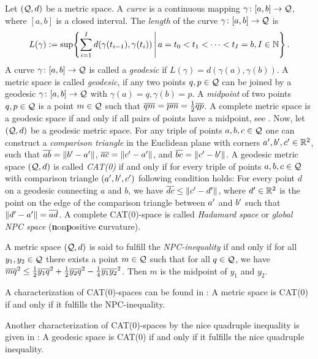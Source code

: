 Let $(\mathcal{Q}, d)$ be a metric space. A \textit{curve} is a continuous mapping $\gamma \colon [a,b] \to \mathcal{Q}$, where $[a,b]$ is a closed interval. The \textit{length} of the curve $\gamma \colon [a,b] \to \mathcal{Q}$ is
%
\begin{equation*}
	L(\gamma) := \sup\mathopen{}\left\lbrace \sum_{i=1}^I d(\gamma(t_{i-1}), \gamma(t_i)) \,\Bigg\vert\, a = t_0 < t_1 < \dots < t_I = b, I\in\mathbb{N} \right\rbrace\mathclose{}
	\, .
\end{equation*}
%
A curve $\gamma \colon [a,b] \to \mathcal{Q}$ is called a \textit{geodesic} if $L(\gamma) = d(\gamma(a),\gamma(b))$.
A metric space is called \textit{geodesic}, if any two points $q,p\in\mathcal{Q}$ can be joined by a geodesic $\gamma \colon [a,b] \to \mathcal{Q}$ with $\gamma(a) = q, \gamma(b) = p$.
A \textit{midpoint} of two points $q,p\in\mathcal{Q}$ is a point $m\in \mathcal{Q}$ such that $\overline{qm} = \overline{pm} = \frac12 \overline{qp}$.
A complete metric space is a geodesic space if and only if all pairs of points have a midpoint, see \cite[Proposition 1.2]{sturm03}.
Now, let $(\mathcal{Q}, d)$ be a geodesic metric space.
For any triple of points $a,b,c\in\mathcal{Q}$ one can construct a \textit{comparison triangle} in the Euclidean plane with corners $a^\prime, b^\prime, c^\prime \in \mathbb{R}^2$, such that $\overline{ab} = \Vert b^\prime - a^\prime \Vert$, $\overline{ac} = \Vert c^\prime - a^\prime \Vert$, and $\overline{bc} = \Vert c^\prime - b^\prime \Vert$. A geodesic metric space  $(\mathcal{Q}, d)$ is called \textit{CAT(0)} if and only if for every triple of points $a,b,c\in\mathcal{Q}$ with comparison triangle $(a^\prime, b^\prime, c^\prime)$ following condition holds: For every point $d$ on a geodesic connecting $a$ and $b$, we have $\overline{dc} \leq \Vert c^\prime - d^\prime \Vert$, where $d^\prime \in \mathbb{R}^2$ is the point on the edge of the comparison triangle between $a^\prime$ and $b^\prime$ such that $\Vert d^\prime- a^\prime \Vert = \overline{ad}$.
A complete CAT(0)-space is called \textit{Hadamard space} or \textit{global NPC space} (\textbf{n}on\textbf{p}ositive \textbf{c}urvature).

A metric space $(\mathcal{Q}, d)$ is said to fulfill the \textit{NPC-inequality} if and only if for all $y_1, y_2 \in \mathcal{Q}$ there exists a point $m\in\mathcal{Q}$ such that for all $q \in \mathcal{Q}$, we have
$\overline{mq}^2 \leq \frac12 \overline{y_1q}^2 + \frac12 \overline{y_2q}^2 - \frac14 \overline{y_1y_2}^2$. Then $m$ is the midpoint of $y_1$ and $y_2$.

A characterization of CAT(0)-spaces can be found in \cite[Section 2]{sturm03}:
	A metric space is CAT(0) if and only if it fulfills the NPC-inequality.

Another characterization of CAT(0)-spaces by the nice quadruple inequality is given in \cite[Corollary 3]{berg08}:
A geodesic space is CAT(0) if and only if it fulfills the nice quadruple inequality.
	
